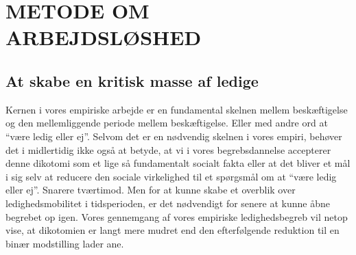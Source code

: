 







\chapter{METODE OM ARBEJDSLØSHED} \label{metode}





\section{At skabe en kritisk masse af ledige \label{ledigskab}}

Kernen i vores empiriske arbejde er en fundamental skelnen mellem beskæftigelse og den mellemliggende periode mellem beskæftigelse. Eller med andre ord at “være ledig eller ej”. Selvom det er en nødvendig skelnen i vores empiri, behøver det i midlertidig ikke også at betyde, at vi i vores begrebsdannelse accepterer denne dikotomi som et lige så fundamentalt socialt fakta eller at det bliver et mål i sig selv at reducere den sociale virkelighed til et spørgsmål om at “være ledig eller ej”. Snarere tværtimod. Men for at kunne skabe et overblik over ledighedsmobilitet i tidsperioden, er det nødvendigt for senere at kunne åbne begrebet op igen. Vores gennemgang af vores empiriske ledighedsbegreb vil netop vise, at dikotomien er langt mere mudret end den efterfølgende reduktion til en binær modstilling lader ane. 





